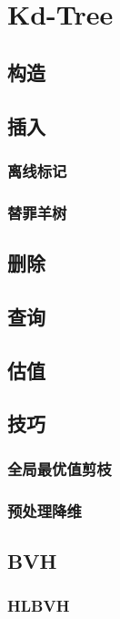 \section{Kd-Tree}
\subsection{构造}
\subsection{插入}
\subsubsection{离线标记}
\subsubsection{替罪羊树}
\subsection{删除}
\subsection{查询}
\subsection{估值}
\subsection{技巧}
\subsubsection{全局最优值剪枝}
\subsubsection{预处理降维}
\subsection{BVH}
\subsubsection{HLBVH}
